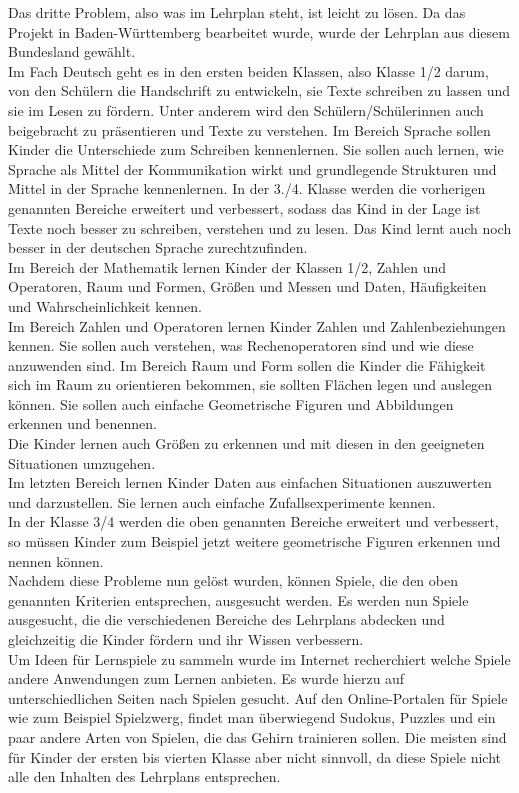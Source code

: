 Das dritte Problem, also was im Lehrplan steht, ist leicht zu lösen. Da das Projekt in Baden-Württemberg bearbeitet wurde, wurde der Lehrplan aus diesem Bundesland gewählt.\\
Im Fach Deutsch geht es in den ersten beiden Klassen, also Klasse 1/2 darum, von den Schülern die Handschrift zu entwickeln, sie Texte schreiben zu lassen und sie im Lesen zu fördern. Unter anderem wird den Schülern/Schülerinnen auch beigebracht zu präsentieren und Texte zu verstehen. Im Bereich Sprache sollen Kinder die Unterschiede zum Schreiben kennenlernen. Sie sollen auch lernen, wie Sprache als Mittel der Kommunikation wirkt und grundlegende Strukturen und Mittel in der Sprache kennenlernen. In der 3./4. Klasse werden die vorherigen genannten Bereiche erweitert und verbessert, sodass das Kind in der Lage ist Texte noch besser zu schreiben, verstehen und zu lesen. Das Kind lernt auch noch besser in der deutschen Sprache zurechtzufinden\autocite{Deutsch:Lehrplan}.\\
Im Bereich der Mathematik lernen Kinder der Klassen 1/2, Zahlen und Operatoren, Raum und Formen, Größen und Messen und Daten, Häufigkeiten und Wahrscheinlichkeit kennen.\\
Im Bereich Zahlen und Operatoren lernen Kinder Zahlen und Zahlenbeziehungen kennen. Sie sollen auch verstehen, was Rechenoperatoren sind und wie diese anzuwenden sind. Im Bereich Raum und Form sollen die Kinder die Fähigkeit sich im Raum zu orientieren bekommen, sie sollten Flächen legen und auslegen können. Sie sollen auch einfache Geometrische Figuren und Abbildungen erkennen und benennen.\\
Die Kinder lernen auch Größen zu erkennen und mit diesen in den geeigneten Situationen umzugehen.\\
Im letzten Bereich lernen Kinder Daten aus einfachen Situationen auszuwerten und darzustellen. Sie lernen auch einfache Zufallsexperimente kennen.
\\
In der Klasse 3/4 werden die oben genannten Bereiche erweitert und verbessert, so müssen Kinder zum Beispiel jetzt weitere geometrische Figuren erkennen und nennen können\autocite{Mathe:Lehrplan}.
\\
Nachdem diese Probleme nun gelöst wurden, können Spiele, die den oben genannten Kriterien entsprechen, ausgesucht werden. Es werden nun Spiele ausgesucht, die die verschiedenen Bereiche des Lehrplans abdecken und gleichzeitig die Kinder fördern und ihr Wissen verbessern.\\
Um Ideen für Lernspiele zu sammeln wurde im Internet recherchiert welche Spiele andere Anwendungen zum Lernen anbieten. Es wurde hierzu auf unterschiedlichen Seiten nach Spielen gesucht. Auf den Online-Portalen für Spiele wie zum Beispiel Spielzwerg, findet man überwiegend Sudokus, Puzzles und ein paar andere Arten von Spielen, die das Gehirn trainieren sollen. Die meisten sind für Kinder der ersten bis vierten Klasse aber nicht sinnvoll, da diese Spiele nicht alle den Inhalten des Lehrplans entsprechen.\\

